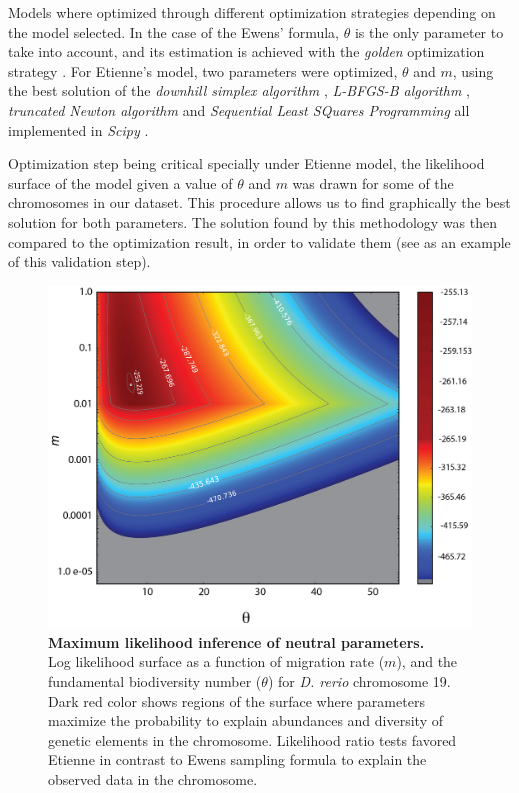 Models where optimized through different optimization strategies depending on the model selected. In the case of the Ewens' formula, $\theta$ is the only parameter to take into account, and its estimation is achieved with the \textit{golden} optimization strategy \cite{Jones2001}. For Etienne's model, two parameters were optimized, $\theta$ and $m$, using the best solution of the \textit{downhill simplex algorithm} \cite{Nelder1965}, \textit{L-BFGS-B algorithm} \cite{Byrd1995}, \textit{truncated Newton algorithm} \cite{Nash1984} and \textit{Sequential Least SQuares Programming} all implemented in \textit{Scipy} \cite{Jones2001}.

Optimization step being critical specially under Etienne model, the likelihood surface of the model given a value of $\theta$ and $m$ was drawn for some of the chromosomes in our dataset. This procedure allows us to find  graphically the best solution for both parameters. The solution found by this methodology was then compared to the optimization result, in order to validate them (see  as an example of this validation step).

\begin{figure}[htpb]
\centering 
\includegraphics[width=\textwidth]{tex_source/figures/untb_genomes/lnl_chrom.png}
\caption[Maximum likelihood inference of neutral parameters.]{{\bf Maximum likelihood inference of neutral parameters.}\\ Log likelihood surface as a function of migration rate ($m$), and the fundamental biodiversity number ($\theta$) for \textit{D. rerio} chromosome 19. Dark red color shows regions of the surface where parameters maximize the probability to explain abundances and diversity of genetic elements in the chromosome. Likelihood ratio tests favored Etienne in contrast to Ewens sampling formula to explain the observed data in the chromosome.}
\label{fig:lnl_chrom}
\end{figure}

